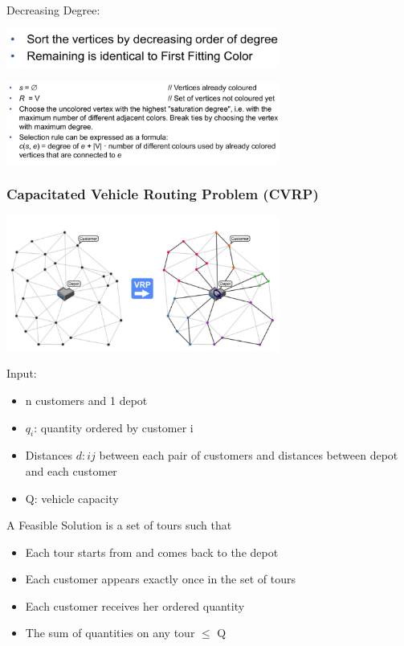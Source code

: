 \documentclass[10pt,a4paper,twocolumn]{article}
\begin{document}
Decreasing Degree:

\begin{center}
	\includegraphics[width=9cm]{images/decreasing-degree}
\end{center}

\begin{center}
	\includegraphics[width=9cm]{images/degree-of-saturation}
\end{center}


\subsubsection{Capacitated Vehicle Routing Problem (CVRP)}
\begin{center}
	\includegraphics[width=9cm]{images/cvrp}
\end{center}


Input:
\begin{itemize}
	\item n customers and 1 depot
	\item $q_{i}$: quantity ordered by customer i
	\item Distances $d:{ij}$ between each pair of customers and distances between depot and each customer
	\item Q: vehicle capacity
\end{itemize}

A Feasible Solution is a set of tours such that
\begin{itemize}
	\item Each tour starts from and comes back to the depot
	\item Each customer appears exactly once in the set of tours
	\item Each customer receives her ordered quantity
	\item The sum of quantities on any tour $\leq$ Q
\end{itemize}
\end{document}
